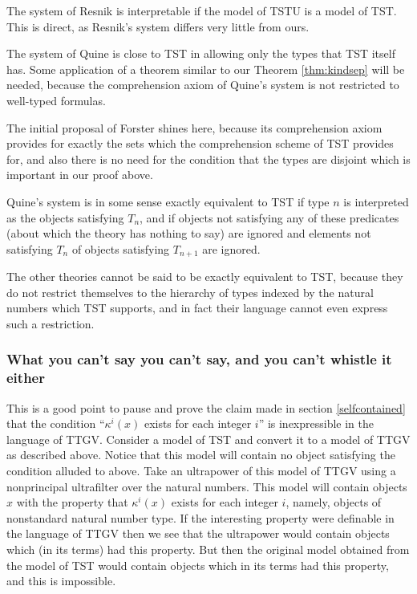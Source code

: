 \documentclass[12pt]{article}
\begin{document}
The system of Resnik is interpretable if the model of TSTU is a model of TST.  This is direct, as Resnik's system differs very little from ours.

The system of Quine is close to TST in allowing only the types that TST itself has.  Some application of a theorem similar to our Theorem \ref{thm:kindsep} will be needed, because the comprehension axiom of Quine's system is not restricted to well-typed formulas.

The initial proposal of Forster shines here, because its comprehension axiom provides for exactly the sets which the comprehension scheme of TST provides for, and also there is no need for the condition that the types are disjoint which is important in our proof above.

Quine's system is in some sense exactly equivalent to TST if type $n$ is interpreted as the objects satisfying $T_n$, and if objects not satisfying any of these predicates (about which the theory has nothing to say) are ignored and elements not satisfying $T_n$ of objects satisfying $T_{n+1}$ are ignored.

The other theories cannot be said to be exactly equivalent to TST, because they do not restrict themselves to the hierarchy of types indexed by the natural numbers which TST supports, and in fact their language cannot even express such a restriction.


\subsubsection{What you can't say you can't say, and you can't whistle it either}\label{whistle}
This is a good point to pause and prove the claim made in section \ref{selfcontained} that the condition ``$\kappa^i(x)$ exists for each integer $i$'' is inexpressible in the language of TTGV.  Consider a model of TST and convert it to a model of TTGV as described above.  Notice that this model will contain no object satisfying the condition alluded to above.  Take an ultrapower of this model of TTGV using a nonprincipal ultrafilter over the natural numbers.  This model will contain objects $x$ with the property that $\kappa^i(x)$ exists for each integer $i$, namely, objects of nonstandard natural number type.  If the interesting property were definable in the language of TTGV then we see that the ultrapower would contain objects which (in its terms) had this property.  But then the original model obtained from the model of TST would contain objects which in its terms had this property, and this is impossible.
\end{document}
